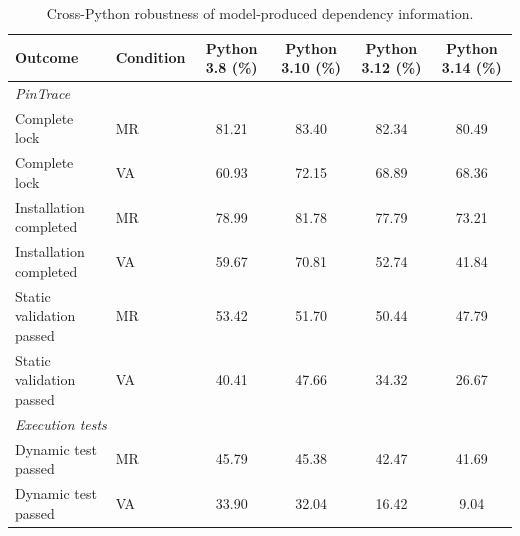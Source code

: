 \begin{table}[t]
\centering
\small
\caption{Cross-Python robustness of model-produced dependency information.}
\label{tab:python_robustness}
\begin{tabular}{llcccc}
\toprule
Outcome & Condition & Python 3.8 (\%) & Python 3.10 (\%) & Python 3.12 (\%) & Python 3.14 (\%) \\
\midrule
\multicolumn{6}{l}{\textit{PinTrace}} \\
Complete lock & MR & 81.21 & 83.40 & 82.34 & 80.49 \\
Complete lock & VA & 60.93 & 72.15 & 68.89 & 68.36 \\
Installation completed & MR & 78.99 & 81.78 & 77.79 & 73.21 \\
Installation completed & VA & 59.67 & 70.81 & 52.74 & 41.84 \\
Static validation passed & MR & 53.42 & 51.70 & 50.44 & 47.79 \\
Static validation passed & VA & 40.41 & 47.66 & 34.32 & 26.67 \\
\midrule
\multicolumn{6}{l}{\textit{Execution tests}} \\
Dynamic test passed & MR & 45.79 & 45.38 & 42.47 & 41.69 \\
Dynamic test passed & VA & 33.90 & 32.04 & 16.42 & 9.04 \\
\bottomrule
\end{tabular}
\end{table}
